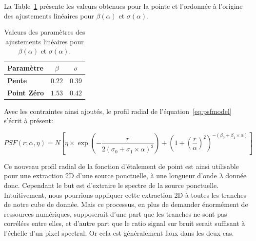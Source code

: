 \documentclass[../main/main.tex]{subfiles}
\begin{document}
La Table~\ref{tab:betasigmapsf} présente les valeurs
obtenues pour la pointe et l'ordonnée à l'origine des ajustements
linéaires pour $\beta(\alpha)$ et $\sigma(\alpha)$. 

\begin{table}[ht]
  \centerfloat
  \renewcommand{\arraystretch}{1.5}
  \caption{Valeurs des paramètres des ajustements linéaires pour
    $\beta(\alpha)$ et $\sigma(\alpha)$.}
  \label{tab:betasigmapsf}
    \begin{threeparttable}
        \begin{tabular}{lcc}
        \toprule
          \textbf{Paramètre} & $\beta$  & $\sigma$ \\
        \midrule
          \textbf{Pente} & $0.22$  &  $0.39$  \\
          \textbf{Point Zéro} & $1.53$  & $0.42$    \\
          
          \bottomrule
        \end{tabular}
    \end{threeparttable}
\end{table}

Avec les contraintes ainsi ajoutés, le profil radial de
l'équation~\ref{eq:psfmodel} s'écrit à présent:

\begin{equation}
  \label{eq:psfmodelconstraint}
  PSF(r; \alpha, \eta) = N\left[\eta\times\exp\left(- \frac{r}{2(\sigma_{0}+\sigma_{1}\times\alpha)^{2}}\right) +
    \left( 1+\left( \frac{r}{\alpha}\right)^{2}\right)^{-(\beta_{0}+\beta_{1}\times\alpha)} \right]
\end{equation}

Ce nouveau profil radial de la fonction d'étalement de point est ainsi
utilisable pour une extraction 2D d'une source ponctuelle, à une
longueur d'onde $\lambda$ donnée donc. Cependant le but est d'extraire
le spectre de la source ponctuelle. Intuitivement, nous pourrions
appliquer cette extraction 2D à toutes les tranches de notre cube de
donnée. Mais ce processus, en plus de demander énormément de ressources
numériques, supposerait d'une part que les tranches ne sont pas corrélées
entre elles, et d'autre part que le ratio signal sur bruit serait
suffisant à l'échelle d'un pixel spectral. Or cela est généralement faux
dans les deux cas.
\end{document}
